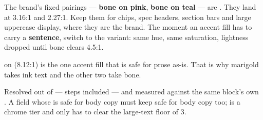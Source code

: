 \documentclass[fontpath=fonts/,logopath=logo/]{riposte-doc}
\begin{document}

The brand's fixed pairings — \textbf{bone on pink}, \textbf{bone on teal} — are . They land at 3.16:1 and 2.27:1. Keep them for chips, spec headers, section bars and large uppercase display, where they are the brand. The moment an accent fill has to carry a \textbf{sentence}, switch to the  variant: same hue, same saturation, lightness dropped until bone clears 4.5:1.

 on  (8.12:1) is the one accent fill that is safe for prose as-is. That is why marigold takes ink text and the other two take bone.



Resolved out of  —  steps included — and measured against the same block's own . A field whose  is safe for body copy must keep  safe for body copy too;  is a chrome tier and only has to clear the large-text floor of 3.
\end{document}
